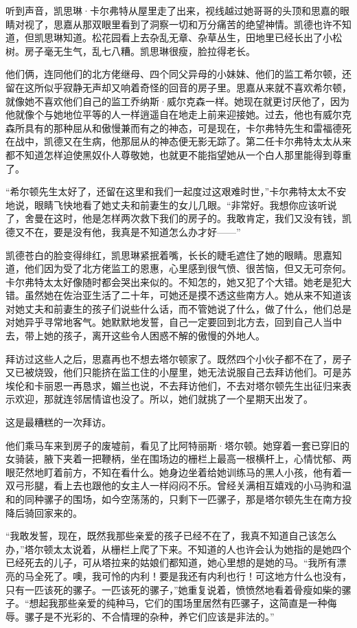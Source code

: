 \par 听到声音，凯思琳·卡尔弗特从屋里走了出来，视线越过她哥哥的头顶和思嘉的眼睛对视了，思嘉从那双眼里看到了洞察一切和万分痛苦的绝望神情。凯德也许不知道，但凯思琳知道。松花园看上去杂乱无章、杂草丛生，田地里已经长出了小松树。房子毫无生气，乱七八糟。凯思琳很瘦，脸拉得老长。
\par 他们俩，连同他们的北方佬继母、四个同父异母的小妹妹、他们的监工希尔顿，还留在这所似乎寂静无声却又响着奇怪的回音的房子里。思嘉从来就不喜欢希尔顿，就像她不喜欢他们自己的监工乔纳斯·威尔克森一样。她现在就更讨厌他了，因为他就像个与她地位平等的人一样逍遥自在地走上前来迎接她。过去，他也有威尔克森所具有的那种屈从和傲慢兼而有之的神态，可是现在，卡尔弗特先生和雷福德死在战中，凯德又在生病，他那屈从的神态便无影无踪了。第二任卡尔弗特太太从来都不知道怎样迫使黑奴仆人尊敬她，也就更不能指望她从一个白人那里能得到尊重了。
\par “希尔顿先生太好了，还留在这里和我们一起度过这艰难时世，”卡尔弗特太太不安地说，眼睛飞快地看了她丈夫和前妻生的女儿几眼。“非常好。我想你应该听说了，舍曼在这时，他是怎样两次救下我们的房子的。我敢肯定，我们又没有钱，凯德又不在，要是没有他，我真是不知道怎么办才好——”
\par 凯德苍白的脸变得绯红，凯思琳紧抿着嘴，长长的睫毛遮住了她的眼睛。思嘉知道，他们因为受了北方佬监工的恩惠，心里感到很气愤、很苦恼，但又无可奈何。卡尔弗特太太好像随时都会哭出来似的。不知怎的，她又犯了个大错。她老是犯大错。虽然她在佐治亚生活了二十年，可她还是摸不透这些南方人。她从来不知道该对她丈夫和前妻生的孩子们说些什么话，而不管她说了什么，做了什么，他们总是对她异乎寻常地客气。她默默地发誓，自己一定要回到北方去，回到自己人当中去，带上她的孩子，离开这些令人困惑不解的傲慢的外地人。
\par 拜访过这些人之后，思嘉再也不想去塔尔顿家了。既然四个小伙子都不在了，房子又已被烧毁，他们只能挤在监工住的小屋里，她无法说服自己去拜访他们。可是苏埃伦和卡丽恩一再恳求，媚兰也说，不去拜访他们，不去对塔尔顿先生出征归来表示欢迎，那就连邻居情谊也没了。所以，她们就挑了一个星期天出发了。
\par 这是最糟糕的一次拜访。
\par 他们乘马车来到房子的废墟前，看见了比阿特丽斯·塔尔顿。她穿着一套已穿旧的女骑装，腋下夹着一把鞭柄，坐在围场边的栅栏上最高一根横杆上，心情忧郁、两眼茫然地盯着前方，不知在看什么。她身边坐着给她训练马的黑人小孩，他有着一双弓形腿，看上去也跟他的女主人一样闷闷不乐。曾经关满相互嬉戏的小马驹和温和的同种骡子的围场，如今空荡荡的，只剩下一匹骡子，那是塔尔顿先生在南方投降后骑回家来的。
\par “我敢发誓，现在，既然我那些亲爱的孩子已经不在了，我真不知道自己该怎么办，”塔尔顿太太说着，从栅栏上爬了下来。不知道的人也许会认为她指的是她四个已经死去的儿子，可从塔拉来的姑娘们都知道，她心里想的是她的马。“我所有漂亮的马全死了。噢，我可怜的内利！要是我还有内利也行！可这地方什么也没有，只有一匹该死的骡子。一匹该死的骡子，”她重复说着，愤愤然地看着骨瘦如柴的骡子。“想起我那些亲爱的纯种马，它们的围场里居然有匹骡子，这简直是一种侮辱。骡子是不光彩的、不合情理的杂种，养它们应该是非法的。”
